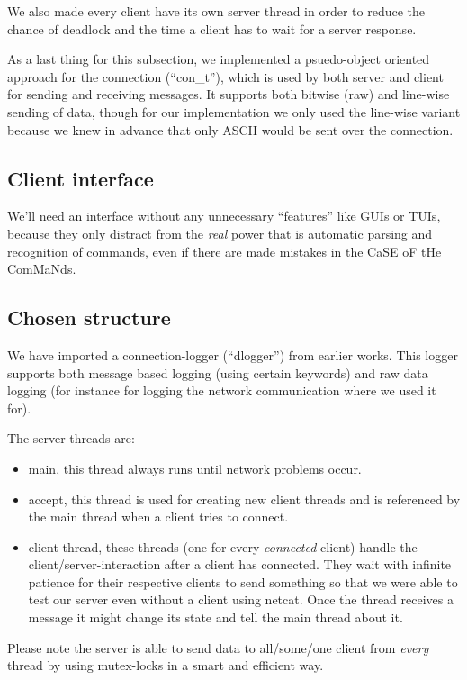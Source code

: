 \documentclass[a4paper]{article}
\begin{document}
We also made every client have its own server thread in order to reduce the
chance of deadlock and the time a client has to wait for a server response.

As a last thing for this subsection, we implemented a psuedo-object oriented
approach for the connection (``con\_t''), which is used by both server and
client for sending and receiving messages. It supports both bitwise (raw) and
line-wise sending of data, though for our implementation we only used the
line-wise variant because we knew in advance that only ASCII would be sent over
the connection.
\subsection{Client interface}
We'll need an interface without any unnecessary ``features'' like GUIs or TUIs,
because they only distract from the \emph{real} power that is automatic parsing
and recognition of commands, even if there are made mistakes in the CaSE oF tHe
ComMaNds.

\subsection{Chosen structure}
We have imported a connection-logger (``dlogger'') from earlier works. This
logger supports both message based logging (using certain keywords) and raw
data logging (for instance for logging the network communication where we used
it for).

The server threads are:
\begin{itemize}
\item main, this thread always runs until network problems occur.
\item accept, this thread is used for creating new client threads and is
referenced by the main thread when a client tries to connect.
\item client thread, these threads (one for every \emph{connected} client)
handle the client/server-interaction after a client has connected. They wait
with infinite patience for their respective clients to send something so that
we were able to test our server even without a client using netcat. Once the
thread receives a message it might change its state and tell the main thread
about it.
\end{itemize}

Please note the server is able to send data to all/some/one client from
\emph{every} thread by using mutex-locks in a smart and efficient way.
\end{document}
